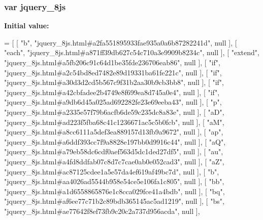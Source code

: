 \subsubsection[{jquery\+\_\+8js}]{\setlength{\rightskip}{0pt plus 5cm}var jquery\+\_\+8js}\label{jquery__8js_8js_ae01a462e6b55b2c5dd3bb52c1146781b}
{\bfseries Initial value\+:}
\begin{DoxyCode}
=
[
    [ \textcolor{stringliteral}{"b"}, \textcolor{stringliteral}{"jquery\_8js.html#a2fa551895933fae935a0a6b87282241d"}, null ],
    [ \textcolor{stringliteral}{"each"}, \textcolor{stringliteral}{"jquery\_8js.html#a871ff39db627c54c710a3e9909b8234c"}, null ],
    [ \textcolor{stringliteral}{"extend"}, \textcolor{stringliteral}{"jquery\_8js.html#a5fb206c91c64d1be35fde236706eab86"}, null ],
    [ \textcolor{stringliteral}{"if"}, \textcolor{stringliteral}{"jquery\_8js.html#a2c54bd8ed7482e89d19331ba61fe221c"}, null ],
    [ \textcolor{stringliteral}{"if"}, \textcolor{stringliteral}{"jquery\_8js.html#a30d3d2cd5b567c9f31b2aa30b9cb3bb8"}, null ],
    [ \textcolor{stringliteral}{"if"}, \textcolor{stringliteral}{"jquery\_8js.html#a42cbfadee2b4749e8f699ea8d745a0e4"}, null ],
    [ \textcolor{stringliteral}{"if"}, \textcolor{stringliteral}{"jquery\_8js.html#a9db6d45a025ad692282fe23e69eeba43"}, null ],
    [ \textcolor{stringliteral}{"p"}, \textcolor{stringliteral}{"jquery\_8js.html#a2335e57f79b6acfb6de59c235dc8a83e"}, null ],
    [ \textcolor{stringliteral}{"aD"}, \textcolor{stringliteral}{"jquery\_8js.html#ad223f5fba68c41c1236671ac5c5b0fcb"}, null ],
    [ \textcolor{stringliteral}{"aM"}, \textcolor{stringliteral}{"jquery\_8js.html#a8cc6111a5def3ea889157d13fb9a9672"}, null ],
    [ \textcolor{stringliteral}{"ap"}, \textcolor{stringliteral}{"jquery\_8js.html#a6ddf393cc7f9a8828e197bb0d9916c44"}, null ],
    [ \textcolor{stringliteral}{"aQ"}, \textcolor{stringliteral}{"jquery\_8js.html#a79eb58dc6cdf0aef563d5dc1ded27df5"}, null ],
    [ \textcolor{stringliteral}{"au"}, \textcolor{stringliteral}{"jquery\_8js.html#a4fd8ddfab07c8d7c7cae0ab0e052cad3"}, null ],
    [ \textcolor{stringliteral}{"aZ"}, \textcolor{stringliteral}{"jquery\_8js.html#ac87125cdee1a5e57da4ef619af49bc7d"}, null ],
    [ \textcolor{stringliteral}{"b"}, \textcolor{stringliteral}{"jquery\_8js.html#aa4026ad5544b958e54ce5e106fa1c805"}, null ],
    [ \textcolor{stringliteral}{"bb"}, \textcolor{stringliteral}{"jquery\_8js.html#a1d6558865876e1c8cca029fce41a4bdb"}, null ],
    [ \textcolor{stringliteral}{"bq"}, \textcolor{stringliteral}{"jquery\_8js.html#af6ee77c71b2c89bdb365145ac5ad1219"}, null ],
    [ \textcolor{stringliteral}{"bs"}, \textcolor{stringliteral}{"jquery\_8js.html#ae77642f8ef73fb9c20c2a737d956acda"}, null ],

\end{DoxyCode}
